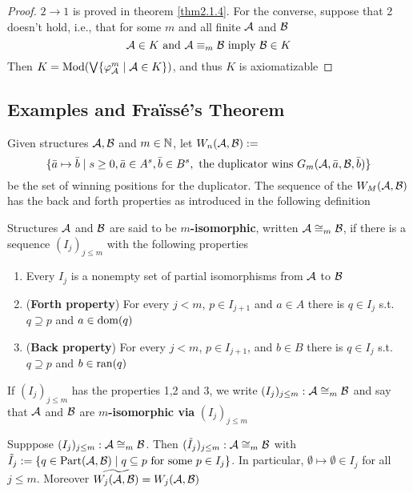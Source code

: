 \documentclass[11pt]{article}
\def \Part {\text{Part}}
\begin{document}
\begin{proof}
\(2\to1\) is proved in theorem \ref{thm2.1.4}. For the converse, suppose that 2 doesn't hold, i.e.,
that for some \(m\) and all finite \(\mathcal{A}\) and \(\mathcal{B}\)
\begin{equation*}
\mathcal{A}\in K\text{ and }\mathcal{A}\equiv_m\mathcal{B}\text{ imply }\mathcal{B}\in K
\end{equation*}
Then \(K=\operatorname{Mod}(\bigvee\{\varphi_{\mathcal{A}}^m\mid \mathcal{A}\in K\})\), and thus \(K\) is axiomatizable
\end{proof}


\subsection{Examples and Fraïssé's Theorem}
\label{sec:org99f8f14}
Given structures \(\mathcal{A},\mathcal{B}\) and \(m\in\mathbb{N}\), let \(W_n(\mathcal{A},\mathcal{B}):=\)
\begin{equation*}
\{\bar{a}\mapsto\bar{b}\mid s\ge0,\bar{a}\in A^s,\bar{b}\in B^s,\text{ the duplicator wins }
G_m(\mathcal{A},\bar{a},\mathcal{B},\bar{b})\}
\end{equation*}
be the set of winning positions for the duplicator. The sequence of the \(W_M(\mathcal{A},\mathcal{B})\) has
the back and forth properties as introduced in the following definition

\begin{definition}[]
Structures \(\mathcal{A}\) and \(\mathcal{B}\) are said to be \textbf{\(m\)-isomorphic},
written \(\mathcal{A}\cong_m\mathcal{B}\), if there is a sequence \((I_j)_{j\le m}\) with the following
properties
\begin{enumerate}
\item Every \(I_j\) is a nonempty set of partial isomorphisms from \(\mathcal{A}\) to \(\mathcal{B}\)
\item (\textbf{Forth property}) For every \(j<m\), \(p\in I_{j+1}\) and \(a\in A\) there is \(q\in I_j\)
s.t. \(q\supseteq p\) and \(a\in\operatorname{dom}(q)\)
\item (\textbf{Back property}) For every \(j<m\), \(p\in I_{j+1}\), and \(b\in B\) there is \(q\in I_j\)
s.t. \(q\supseteq p\) and \(b\in\operatorname{ran}(q)\)
\end{enumerate}


If \((I_j)_{j\le m}\) has the properties 1,2 and 3, we write \((I_j)_{j\le m}:\mathcal{A}\cong_m\mathcal{B}\)
and say that \(\mathcal{A}\) and \(\mathcal{B}\) are \textbf{\(m\)-isomorphic via} \((I_j)_{j\le m}\)
\end{definition}

\begin{exercise}
\label{ex2.3.2}
Supppose \((I_j)_{j\le m}:\mathcal{A}\cong_m\mathcal{B}\).
Then \((\tilde{I}_j)_{j\le m}:\mathcal{A}\cong_m\mathcal{B}\)
with \(\tilde{I}_j:=\{q\in\Part(\cala,\calb)\mid q\subseteq p\text{ for some }p\in I_j\}\).
In particular, \(\emptyset\mapsto\emptyset\in I_j\) for all \(j\le m\). Moreover
\(\widetilde{W_j(\mathcal{A},\mathcal{B})}=W_j(\mathcal{A},\mathcal{B})\)
\end{exercise}
\end{document}

